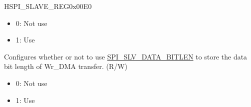 \begin{register}{H}{SPI\_SLAVE\_REG}{0x00E0}
\begin{regdesc}
\begin{reglist}
\begin{itemize}
    \item 0: Not use
    \item 1: Use
\end{itemize}
\label{fielddesc:SPISLVWRDMABITLENEN}\item [SPI\_SLV\_WRDMA\_BITLEN\_EN] Configures whether or not to use \hyperref[fielddesc:SPISLVDATABITLEN]{SPI\_SLV\_DATA\_BITLEN} to store the data bit length of Wr\_DMA transfer. (R/W)\\
\begin{itemize}
    \item 0: Not use
    \item 1: Use
\end{itemize}
\item [Continued on the next page...]
\end{reglist}\end{regdesc}
\end{register}

